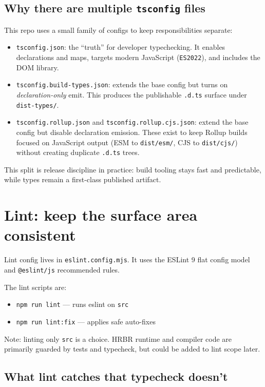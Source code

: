 \subsection{Why there are multiple \texttt{tsconfig} files}

This repo uses a small family of configs to keep responsibilities separate:

\begin{itemize}
\item \texttt{tsconfig.json}: the ``truth'' for developer typechecking.
It enables declarations and maps, targets modern JavaScript (\texttt{ES2022}), and includes the DOM library.
\item \texttt{tsconfig.build-types.json}: extends the base config but turns on \emph{declaration-only} emit.
This produces the publishable \texttt{.d.ts} surface under \texttt{dist-types/}.
\item \texttt{tsconfig.rollup.json} and \texttt{tsconfig.rollup.cjs.json}: extend the base config but disable declaration emission.
These exist to keep Rollup builds focused on JavaScript output (ESM to \texttt{dist/esm/}, CJS to \texttt{dist/cjs/}) without creating duplicate \texttt{.d.ts} trees.
\end{itemize}

This split is release discipline in practice: build tooling stays fast and predictable, while types remain a first-class published artifact.

\section{Lint: keep the surface area consistent}

Lint config lives in \texttt{eslint.config.mjs}.
It uses the ESLint 9 flat config model and \texttt{@eslint/js} recommended rules.

The lint scripts are:

\begin{itemize}
\item \texttt{npm run lint} --- runs eslint on \texttt{src}
\item \texttt{npm run lint:fix} --- applies safe auto-fixes
\end{itemize}

Note: linting only \texttt{src} is a choice. HRBR runtime and compiler code are primarily guarded by tests and typecheck, but could be added to lint scope later.

\subsection{What lint catches that typecheck doesn't}

